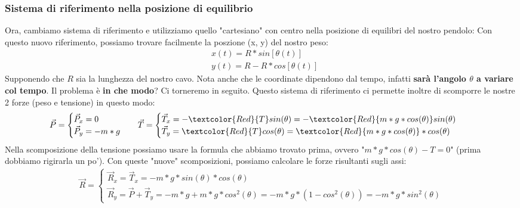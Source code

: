         \subsubsection{Sistema di riferimento nella posizione di equilibrio}
            Ora, cambiamo sistema di riferimento e utilizziamo quello "cartesiano" con centro nella posizione di equilibri del nostro pendolo:
            Con questo nuovo riferimento, possiamo trovare facilmente la poszione (x, y) del nostro peso:
            \begin{align*}
                &x(t) = R * sin[\theta(t)]\\
                &y(t) = R - R*cos[\theta(t)]
            \end{align*}
            Supponendo che $R$ sia la lunghezza del nostro cavo. Nota anche che le coordinate dipendono dal tempo, infatti \textbf{sarà l'angolo $\theta$ a variare col tempo}. Il problema è \textbf{in che modo}? Ci torneremo in seguito. Questo sistema di riferimento ci permette inoltre di scomporre le nostre 2 forze (peso e tensione) in questo modo:
            \begin{align*}
                &\vec{P} =
                \begin{cases}
                    \vec{P}_x = 0\\
                    \vec{P}_y = -m*g
                \end{cases}
                &&\vec{T} =
                \begin{cases}
                    \vec{T}_x = -\textcolor{Red}{T}sin(\theta) = -\textcolor{Red}{m*g*cos(\theta)}sin(\theta)\\
                    \vec{T}_y = \textcolor{Red}{T}cos(\theta) =  \textcolor{Red}{m*g*cos(\theta)}*cos(\theta)
                \end{cases}
            \end{align*}
            Nella scomposizione della tensione possiamo usare la formula che abbiamo trovato prima, ovvero "$m*g*cos(\theta) - T = 0$" (prima dobbiamo rigirarla un po'). Con queste "nuove" scomposizioni, possiamo calcolare le forze risultanti sugli assi:
            \begin{align*}
                \vec{R}=
                \begin{cases}
                    \vec{R}_x = \vec{T}_x = -m*g*sin(\theta)*cos(\theta)\\
                    \vec{R}_y = \vec{P} + \vec{T}_y = -m*g + m*g*cos^2(\theta) = -m*g*(1-cos^2(\theta)) = -m*g*sin^2(\theta)
                \end{cases}
            \end{align*}

